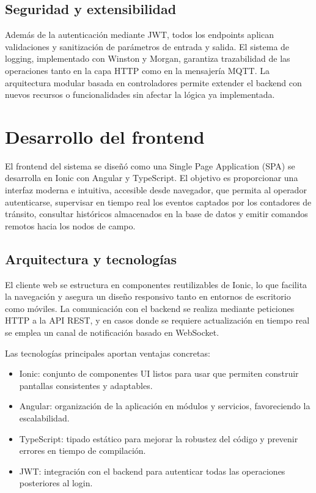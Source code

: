 \subsection{Seguridad y extensibilidad}

Además de la autenticación mediante JWT, todos los endpoints aplican validaciones y sanitización de parámetros de entrada y salida. El sistema de logging, implementado con Winston y Morgan, garantiza trazabilidad de las operaciones tanto en la capa HTTP como en la mensajería MQTT. La arquitectura modular basada en controladores permite extender el backend con nuevos recursos o funcionalidades sin afectar la lógica ya implementada.


\section{Desarrollo del frontend}

El frontend del sistema se diseñó como una Single Page Application (SPA) se desarrolla en Ionic con Angular y TypeScript.  
El objetivo es proporcionar una interfaz moderna e intuitiva, accesible desde navegador, que permita al operador autenticarse, supervisar en tiempo real los eventos captados por los contadores de tránsito, consultar históricos almacenados en la base de datos y emitir comandos remotos hacia los nodos de campo.  

\subsection{Arquitectura y tecnologías}

El cliente web se estructura en componentes reutilizables de Ionic, lo que facilita la navegación y asegura un diseño responsivo tanto en entornos de escritorio como móviles.  
La comunicación con el backend se realiza mediante peticiones HTTP a la API REST, y en casos donde se requiere actualización en tiempo real se emplea un canal de notificación basado en WebSocket.

Las tecnologías principales aportan ventajas concretas:
\begin{itemize}
    \item Ionic: conjunto de componentes UI listos para usar que permiten construir pantallas consistentes y adaptables.
    \item Angular: organización de la aplicación en módulos y servicios, favoreciendo la escalabilidad.
    \item TypeScript: tipado estático para mejorar la robustez del código y prevenir errores en tiempo de compilación.
    \item JWT: integración con el backend para autenticar todas las operaciones posteriores al login.
\end{itemize}

